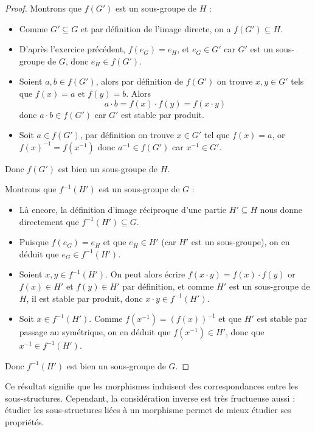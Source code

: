 \begin{proof}
    Montrons que $f(G')$ est un sous-groupe de $H$ :
    \begin{itemize}[label=$\bullet$]
        \item Comme $G'\subseteq G$ et par définition de l'image directe, on a $f(G')\subseteq H$.
        \item D'après l'exercice précédent, $f(e_G) = e_H$, et $e_G\in G'$ car $G'$ est un sous-groupe de $G$, donc $e_H\in f(G')$.
        \item Soient $a,b\in f(G')$, alors par définition de $f(G')$ on trouve $x,y\in G'$ tels que $f(x)=a$ et $f(y) = b$. Alors $$a\cdot b = f(x)\cdot f(y) = f(x\cdot y)$$ donc $a\cdot b \in f(G')$ car $G'$ est stable par produit. 
        \item Soit $a\in f(G')$, par définition on trouve $x\in G'$ tel que $f(x) = a$, or $f(x)^{-1} = f(x^{-1})$ donc $a^{-1}\in f(G')$ car $x^{-1}\in G'$.
    \end{itemize}
    Donc $f(G')$ est bien un sous-groupe de $H$.

    Montrons que $f^{-1}(H')$ est un sous-groupe de $G$ :
    \begin{itemize}[label=$\bullet$]
        \item Là encore, la définition d'image réciproque d'une partie $H'\subseteq H$ nous donne directement que $f^{-1}(H')\subseteq G$.
        \item Puisque $f(e_G) = e_H$ et que $e_H\in H'$ (car $H'$ est un sous-groupe), on en déduit que $e_G\in f^{-1}(H')$.
        \item Soient $x,y\in f^{-1}(H')$. On peut alors écrire $f(x\cdot y) = f(x)\cdot f(y)$ or $f(x)\in H'$ et $f(y)\in H'$ par définition, et comme $H'$ est un sous-groupe de $H$, il est stable par produit, donc $x\cdot y \in f^{-1}(H')$.
        \item Soit $x\in f^{-1}(H')$. Comme $f(x^{-1}) = (f(x))^{-1}$ et que $H'$ est stable par passage au symétrique, on en déduit que $f(x^{-1})\in H'$, donc que $x^{-1}\in f^{-1}(H')$.
    \end{itemize}
    Donc $f^{-1}(H')$ est bien un sous-groupe de $G$.
\end{proof}

Ce résultat signifie que les morphismes induisent des correspondances entre les sous-structures. Cependant, la considération inverse est très fructueuse aussi : étudier les sous-structures liées à un morphisme permet de mieux étudier ses propriétés.

